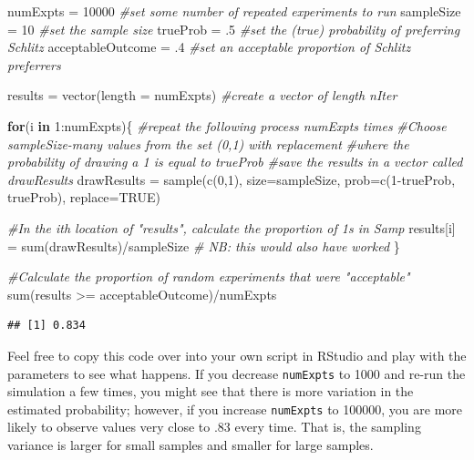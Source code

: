 \documentclass[
  openany]{book}
\newenvironment{Shaded}{\begin{snugshade}}{\end{snugshade}}
\newcommand{\AttributeTok}[1]{\textcolor[rgb]{0.77,0.63,0.00}{#1}}
\newcommand{\CommentTok}[1]{\textcolor[rgb]{0.56,0.35,0.01}{\textit{#1}}}
\newcommand{\ConstantTok}[1]{\textcolor[rgb]{0.00,0.00,0.00}{#1}}
\newcommand{\ControlFlowTok}[1]{\textcolor[rgb]{0.13,0.29,0.53}{\textbf{#1}}}
\newcommand{\DecValTok}[1]{\textcolor[rgb]{0.00,0.00,0.81}{#1}}
\newcommand{\FunctionTok}[1]{\textcolor[rgb]{0.00,0.00,0.00}{#1}}
\newcommand{\NormalTok}[1]{#1}
\newcommand{\OtherTok}[1]{\textcolor[rgb]{0.56,0.35,0.01}{#1}}
\newcommand{\SpecialCharTok}[1]{\textcolor[rgb]{0.00,0.00,0.00}{#1}}
\begin{document}
\begin{Shaded}
\begin{Highlighting}[]
\NormalTok{numExpts }\OtherTok{=} \DecValTok{10000} \CommentTok{\#set some number of repeated experiments to run}
\NormalTok{sampleSize }\OtherTok{=} \DecValTok{10} \CommentTok{\#set the sample size  }
\NormalTok{trueProb }\OtherTok{=}\NormalTok{ .}\DecValTok{5} \CommentTok{\#set the (true) probability of preferring Schlitz}
\NormalTok{acceptableOutcome }\OtherTok{=}\NormalTok{ .}\DecValTok{4} \CommentTok{\#set an acceptable proportion of Schlitz preferrers}

\NormalTok{results }\OtherTok{=} \FunctionTok{vector}\NormalTok{(}\AttributeTok{length =}\NormalTok{ numExpts) }\CommentTok{\#create a vector of length nIter}

\ControlFlowTok{for}\NormalTok{(i }\ControlFlowTok{in} \DecValTok{1}\SpecialCharTok{:}\NormalTok{numExpts)\{ }\CommentTok{\#repeat the following process numExpts times}
   \CommentTok{\#Choose sampleSize{-}many values from the set (0,1) with replacement}
   \CommentTok{\#where the probability of drawing a 1 is equal to trueProb}
   \CommentTok{\#save the results in a vector called drawResults}
\NormalTok{   drawResults }\OtherTok{=} \FunctionTok{sample}\NormalTok{(}\FunctionTok{c}\NormalTok{(}\DecValTok{0}\NormalTok{,}\DecValTok{1}\NormalTok{), }\AttributeTok{size=}\NormalTok{sampleSize, }\AttributeTok{prob=}\FunctionTok{c}\NormalTok{(}\DecValTok{1}\SpecialCharTok{{-}}\NormalTok{trueProb, trueProb), }\AttributeTok{replace=}\ConstantTok{TRUE}\NormalTok{)}

   \CommentTok{\#In the ith location of "results", calculate the proportion of 1s in Samp}
\NormalTok{   results[i] }\OtherTok{=} \FunctionTok{sum}\NormalTok{(drawResults)}\SpecialCharTok{/}\NormalTok{sampleSize}
   \CommentTok{\# NB: this would also have worked }
\NormalTok{\}}

\CommentTok{\#Calculate the proportion of random experiments that were "acceptable"}
\FunctionTok{sum}\NormalTok{(results }\SpecialCharTok{\textgreater{}=}\NormalTok{ acceptableOutcome)}\SpecialCharTok{/}\NormalTok{numExpts}
\end{Highlighting}
\end{Shaded}

\begin{verbatim}
## [1] 0.834
\end{verbatim}

Feel free to copy this code over into your own script in RStudio and play with the parameters to see what happens. If you decrease \texttt{numExpts} to 1000 and re-run the simulation a few times, you might see that there is more variation in the estimated probability; however, if you increase \texttt{numExpts} to 100000, you are more likely to observe values very close to .83 every time. That is, the sampling variance is larger for small samples and smaller for large samples.
\end{document}
